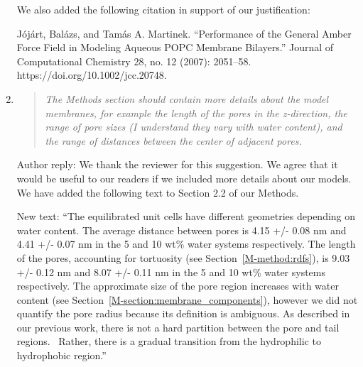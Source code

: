 \documentclass{article}
\begin{document}
\begin{enumerate}
  	We also added the following citation in support of our justification:
  	

    Jójárt, Balázs, and Tamás A. Martinek. “Performance of the General Amber Force Field
    in Modeling Aqueous POPC Membrane Bilayers.” Journal of Computational Chemistry 28, 
    no. 12 (2007): 2051–58. https://doi.org/10.1002/jcc.20748.

    \item \begin{quote}
    
    \textit{The Methods section should contain more details about the model membranes, for 
    example the length of the pores in the z-direction, the range of pore sizes (I understand
    they vary with water content), and the range of distances between the center of adjacent pores.}    
    
    \end{quote}
    
    Author reply: We thank the reviewer for this suggestion. We agree that it would be useful
    to our readers if we included more details about our models. We have added the following 
    text to Section 2.2 of our Methods.
    
    New text: ``The equilibrated unit cells have different geometries depending on water
    content. The average distance between pores is 4.15 +/- 0.08 nm and 4.41 +/- 0.07 nm
    in the 5 and 10 wt\% water systems respectively. The length of the pores, accounting
    for tortuosity (see Section~\ref{M-method:rdfs}), is 9.03 +/- 0.12 nm and 8.07 +/- 0.11
    nm in the 5 and 10 wt\% water systems respectively. The approximate size of the pore
    region increases with water content (see Section~\ref{M-section:membrane_components}), 
    however we did not quantify the pore radius because its definition is ambiguous. As
    described in our previous work, there is not a hard partition between the pore and tail
    regions.~\cite{coscia_understanding_2019} Rather, there is a gradual transition from 
    the hydrophilic to hydrophobic region.''  
    

\end{enumerate}
\end{document}

